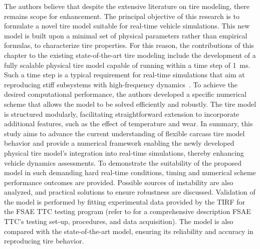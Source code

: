 %

The authors believe that despite the extensive literature on tire modeling, there remains scope for enhancement. The principal objective of this research is to formulate a novel tire model suitable for real-time vehicle simulations. This new model is built upon a minimal set of physical parameters rather than empirical formulas, to characterize tire properties. For this reason, the contributions of this chapter to the existing state-of-the-art tire modeling include the development of a fully scalable physical tire model capable of running within a time step of \SI{1}{\milli\second}. Such a time step is a typical requirement for real-time simulations that aim at reproducing stiff subsystems with high-frequency dynamics~\cite{pacejka2012tire}. To achieve the desired computational performance, the authors developed a specific numerical scheme that allows the model to be solved efficiently and robustly. The tire model is structured modularly, facilitating straightforward extension to incorporate additional features, such as the effect of temperature and wear. In summary, this study aims to advance the current understanding of flexible carcass tire model behavior and provide a numerical framework enabling the newly developed physical tire model's integration into real-time simulations, thereby enhancing vehicle dynamics assessments. To demonstrate the suitability of the proposed model in such demanding hard real-time conditions, timing and numerical scheme performance outcomes are provided. Possible sources of instability are also analyzed, and practical solutions to ensure robustness are discussed. Validation of the model is performed by fitting experimental data provided by the \ac{TIRF} for the \ac{FSAE} \ac{TTC} testing program (refer to \citet{kasprzak2006formula} for a comprehensive description \ac{FSAE} \ac{TTC}'s testing set-up, procedures, and data acquisition). The model is also compared with the state-of-the-art \MagicFormulae{} model, ensuring its reliability and accuracy in reproducing tire behavior.

